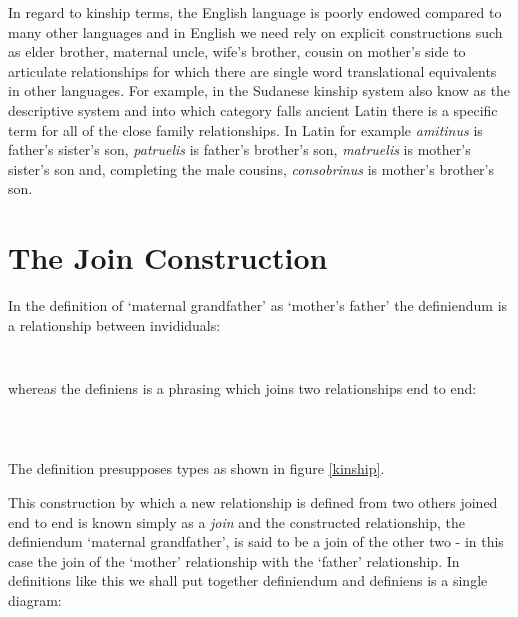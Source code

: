 \noindent In regard to kinship terms, the English language is poorly endowed compared to many other languages and in English we need rely on explicit constructions such as elder brother, maternal uncle, wife's brother, cousin on mother's side to articulate relationships for which there are single word translational equivalents in other languages. For example, in the Sudanese kinship system also know as the descriptive system and into which category falls ancient Latin there is a specific term for all of the close family relationships.  In Latin for example \textit{amitinus} is father's sister's son, \textit{patruelis} is father's brother's son, \textit{matruelis} is mother's sister's son and, completing the male cousins, \textit{consobrinus} is mother's brother's son.  \\

\section{The Join Construction}
\noindent In the definition of `maternal grandfather' as `mother's father' the definiendum is a relationship between invididuals: \\
\begin{equation}
\raisebox{-0.5cm}{ %

}
\end{equation}

\noindent whereas the definiens is a phrasing which joins two relationships end to end:\\

\begin{equation}
\raisebox{-0.95cm}{

}
\end{equation}

\noindent The definition presupposes types as shown in figure \ref{kinship}.


\noindent This construction by which a new relationship is defined from two others joined end to end is known simply as a \textit{join} and the constructed relationship, the definiendum `maternal grandfather', is said to be a join of the other two - in this case the join of the `mother' relationship with the `father' relationship. In definitions like this we shall put together definiendum and definiens is a single diagram:  \\


